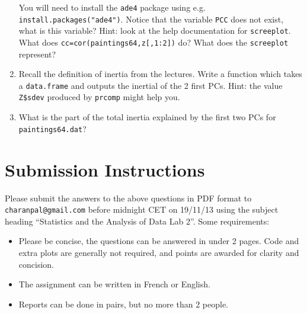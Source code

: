 \documentclass[a4paper,10pt]{article}
\begin{document}
\begin{enumerate}
You will need to install the \texttt{ade4} package using e.g. \texttt{install.packages("ade4")}.  Notice that the variable \texttt{PCC} does not exist, what is this variable? Hint: look at the help documentation for \texttt{screeplot}. What does \texttt{cc=cor(paintings64,z[,1:2])} do? What does the \texttt{screeplot} represent? 
\item Recall the definition of inertia from the lectures. Write a function which takes a \texttt{data.frame} and outputs the inertial of the 2 first PCs. Hint: the value \texttt{Z\$sdev} produced by \texttt{prcomp} might help you. 
\item What is the part of the total inertia explained by the first two PCs for \texttt{paintings64.dat}?  
\end{enumerate}

\section{Submission Instructions}

Please submit the answers to the above questions in PDF format to \texttt{charanpal@gmail.com} before midnight CET on 19/11/13 using the subject heading ``Statistics and the Analysis of Data Lab 2''. Some requirements: 
\begin{itemize} 
 \item Please be concise, the questions can be answered in under 2 pages. Code and extra plots are generally not required, and points are awarded for clarity and concision. 
 \item The assignment can be written in French or English. 
 \item Reports can be done in pairs, but no more than 2 people.   
\end{itemize}
\end{document}
